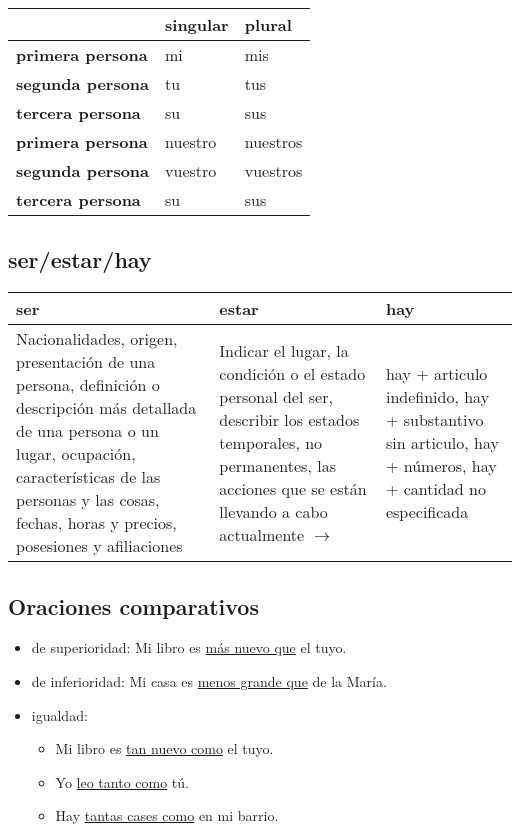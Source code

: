 \documentclass{article}
\begin{document}
	\begin{center}
		\begin{tabular}{l|l|l}
			& \textbf{singular} & \textbf{plural} \\
			\hline
			\textbf{primera persona} & mi & mis \\
			\hline
			\textbf{segunda persona} & tu & tus \\
			\hline
			\textbf{tercera persona} & su & sus \\
			\hline
			\textbf{primera persona} & nuestro & nuestros \\
			\hline
			\textbf{segunda persona} & vuestro & vuestros \\
			\hline
			\textbf{tercera persona} & su & sus
		\end{tabular}
	\end{center}

	\subsection{ser/estar/hay}
	
	\begin{center}
		\begin{tabular}{L{4.5cm}|L{4.5cm}|L{4.5cm}}
			\textbf{ser} & \textbf{estar} & \textbf{hay} \\
			\hline
			Nacionalidades, origen, presentación de una persona, definición o descripción más detallada de una persona o un lugar, ocupación, características de las personas y las cosas, fechas, horas y precios, posesiones y afiliaciones & Indicar el lugar, la condición o el estado personal del ser, describir los estados temporales, no permanentes, las acciones que se están llevando a cabo actualmente $\to$  & hay + articulo indefinido, hay + substantivo sin articulo, hay + números, hay + cantidad no especificada
		\end{tabular}
	\end{center}

	\subsection{Oraciones comparativos}
	\begin{itemize}
		\item de superioridad: Mi libro es \underline{más nuevo que} el tuyo.
		\item de inferioridad: Mi casa es \underline{menos grande que} de la María.
		\item igualdad:
		\begin{itemize}
			\item Mi libro es \underline{tan nuevo como} el tuyo.
			\item Yo \underline{leo tanto como} tú.
			\item Hay \underline{tantas cases como} en mi barrio.
		\end{itemize}
	\end{itemize}
\end{document}
